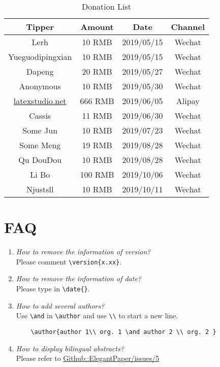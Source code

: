 \documentclass[11pt,en,authoryear]{elegantpaper}
\begin{document}
\begin{table}[!h]
	\centering
	\caption{Donation List}
	\begin{tabular}{cccc}
		\toprule
		Tipper   & Amount & Date & Channel \\
		\midrule
		Lerh  & 10 RMB  & 2019/05/15 & Wechat \\
		Yueguodipingxian & 10 RMB   & 2019/05/15 & Wechat \\
		Dapeng & 20 RMB & 2019/05/27 & Wechat\\
		Anonymous & 10 RMB & 2019/05/30 & Wechat \\
		\href{http://www.latexstudio.net/}{latexstudio.net} & 666 RMB & 2019/06/05 & Alipay \\
		Cassis & 11 RMB & 2019/06/30 & Wechat \\
		Some Jun & 10 RMB & 2019/07/23 & Wechat \\
		Some Meng & 19 RMB & 2019/08/28 & Wechat \\
		Qu DouDou & 10 RMB & 2019/08/28 & Wechat \\
		Li Bo & 100 RMB & 2019/10/06 & Wechat\\
		Njustsll & 10 RMB & 2019/10/11 & Wechat \\
		\bottomrule
	\end{tabular}%
\end{table}%

\section{FAQ}

\begin{enumerate}[label=\arabic*).]
	\item \textit{How to remove the information of version?}\\
    Please comment \lstinline|\version{x.xx}|.
	\item \textit{How to remove the information of date?}\\
	Please type in \lstinline|\date{}|.
	\item \textit{How to add several authors?}\\
	Use \lstinline{\and} in \lstinline{\author} and use \lstinline{\\} to start a new line.
	\begin{lstlisting}
	\author{author 1\\ org. 1 \and author 2 \\ org. 2 }
	\end{lstlisting}
	\item \textit{How to display bilingual abstracts?}\\
	Please refer to \href{https://github.com/ElegantLaTeX/ElegantPaper/issues/5}{Github::ElegantPaper/issues/5}
\end{enumerate}
\end{document}
